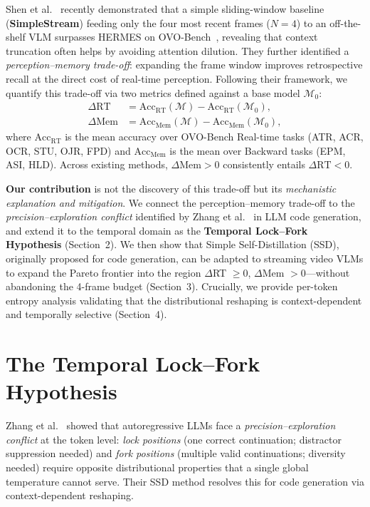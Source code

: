 \documentclass[11pt,a4paper]{article}
\begin{document}
Shen et al.~\cite{simplestream} recently demonstrated that a simple sliding-window baseline (\textbf{SimpleStream}) feeding only the four most recent frames ($N=4$) to an off-the-shelf VLM surpasses HERMES on OVO-Bench~\cite{ovobench}, revealing that context truncation often helps by avoiding attention dilution. They further identified a \textit{perception--memory trade-off}: expanding the frame window improves retrospective recall at the direct cost of real-time perception. Following their framework, we quantify this trade-off via two metrics defined against a base model $\mathcal{M}_0$:
\begin{align}
\Delta\text{RT} &= \text{Acc}_{\text{RT}}(\mathcal{M}) - \text{Acc}_{\text{RT}}(\mathcal{M}_0), \label{eq:drt}\\
\Delta\text{Mem} &= \text{Acc}_{\text{Mem}}(\mathcal{M}) - \text{Acc}_{\text{Mem}}(\mathcal{M}_0), \label{eq:dmem}
\end{align}
where $\text{Acc}_{\text{RT}}$ is the mean accuracy over OVO-Bench Real-time tasks (ATR, ACR, OCR, STU, OJR, FPD) and $\text{Acc}_{\text{Mem}}$ is the mean over Backward tasks (EPM, ASI, HLD). Across existing methods, $\Delta\text{Mem} > 0$ consistently entails $\Delta\text{RT} < 0$.

\textbf{Our contribution} is not the discovery of this trade-off but its \textit{mechanistic explanation and mitigation}. We connect the perception--memory trade-off to the \textit{precision--exploration conflict} identified by Zhang et al.~\cite{ssd} in LLM code generation, and extend it to the temporal domain as the \textbf{Temporal Lock--Fork Hypothesis} (Section~2). We then show that Simple Self-Distillation (SSD), originally proposed for code generation, can be adapted to streaming video VLMs to expand the Pareto frontier into the region $\Delta$RT $\geq 0$, $\Delta$Mem $> 0$---without abandoning the 4-frame budget (Section~3). Crucially, we provide per-token entropy analysis validating that the distributional reshaping is context-dependent and temporally selective (Section~4).

\section{The Temporal Lock--Fork Hypothesis}
Zhang et al.~\cite{ssd} showed that autoregressive LLMs face a \textit{precision--exploration conflict} at the token level: \textit{lock positions} (one correct continuation; distractor suppression needed) and \textit{fork positions} (multiple valid continuations; diversity needed) require opposite distributional properties that a single global temperature cannot serve. Their SSD method resolves this for code generation via context-dependent reshaping.
\end{document}
